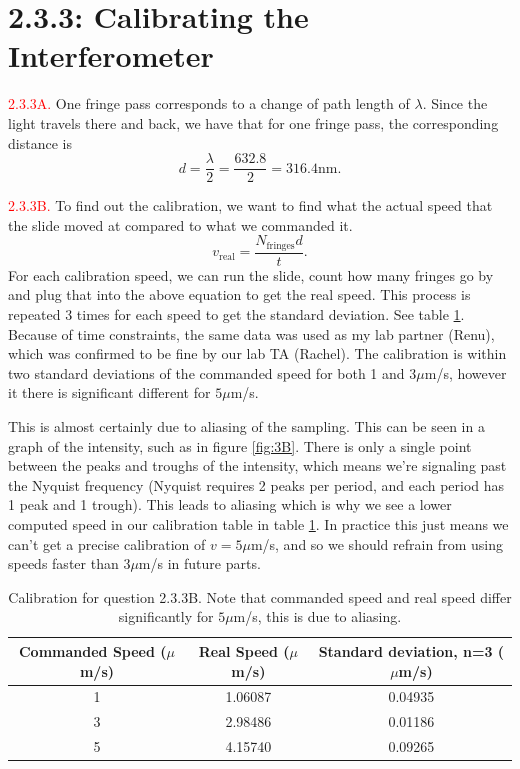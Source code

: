 \documentclass[letterpaper, reqno,11pt]{article}
\begin{document}
\section{2.3.3: Calibrating the Interferometer}

\noindent \textcolor{red}{2.3.3A.} One fringe pass corresponds to a change of path length of $\lambda$. Since the light travels there and back, we have that for one fringe pass, the corresponding distance is
\[
d=\frac{\lambda}{2}=\frac{632.8}{2}=316.4\text{nm}
.\]

\noindent \textcolor{red}{2.3.3B.} To find out the calibration, we want to find what the actual speed that the slide moved at compared to what we commanded it.
\[
    v_{\text{real}}= \frac{N_{\text{fringes}}d}{t}
.\]
For each calibration speed, we can run the slide, count how many fringes go by and plug that into the above equation to get the real speed. This process is repeated 3 times for each speed to get the standard deviation. See table \ref{tab:3B}. Because of time constraints, the same data was used as my lab partner (Renu), which was confirmed to be fine by our lab TA (Rachel). The calibration is within two standard deviations of the commanded speed for both 1 and $3\mu$m/s, however it there is significant different for $5\mu$m/s. 

This is almost certainly due to aliasing of the sampling. This can be seen in a graph of the intensity, such as in figure \ref{fig:3B}. There is only a single point between the peaks and troughs of the intensity, which means we're signaling past the Nyquist frequency (Nyquist requires 2 peaks per period, and each period has 1 peak and 1 trough). This leads to aliasing which is why we see a lower computed speed in our calibration table in table \ref{tab:3B}. In practice this just means we can't get a precise calibration of $v=5\mu$m/s, and so we should refrain from using speeds faster than $3\mu$m/s in future parts.

\begin{table}[htpb]
    \centering
    \caption{Calibration for question 2.3.3B. Note that commanded speed and real speed differ significantly for $5\mu$m/s, this is due to aliasing.}
    \label{tab:3B}
    \begin{tabular}{|c|c|c|}
    \hline
    Commanded Speed ($\mu$m/s) & Real Speed ($\mu$m/s) & Standard deviation, n=3 ($\mu$m/s) \\
    \hline
    1              & 1.06087    & 0.04935            \\
    3              & 2.98486    & 0.01186            \\
    5              & 4.15740    & 0.09265            \\
    \hline
    \end{tabular}
\end{table}
\end{document}
